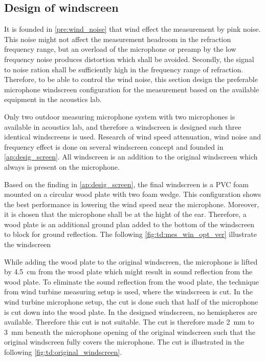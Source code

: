 \subsection{Design of windscreen}\label{ds:wind_scr}
It is founded in \autoref{pre:wind_noise} that wind effect the measurement by pink noise. This noise might not affect the measurement headroom in the refraction frequency range, but an overload of the microphone or preamp by the low frequency noise produces distortion which shall be avoided. Secondly, the signal to noise ration shall be sufficiently high in the frequency range of refraction. Therefore, to be able to control the wind noise, this section design the preferable microphone windscreen configuration for the measurement based on the available equipment in the acoustics lab. 

Only two outdoor measuring microphone system with two microphones is available in acoustics lab, and therefore a windscreen is designed such three identical windscreens is used. Research of wind speed attenuation, wind noise and frequency effect is done on several windscreen concept and founded in \autoref{ap:desig_screen}. All windscreen is an addition to the original windscreen which always is present on the microphone. 

Based on the finding in \autoref{ap:desig_screen}, the final windscreen is a PVC foam mounted on a circular wood plate with two foam wedge. This configuration shows the best performance in lowering the wind speed near the microphone. Moreover, it is chosen that the microphone shall be at the hight of the ear. Therefore, a wood plate is an additional ground plan added to the bottom of the windscreen to block for ground reflection. The following \autoref{fig:td:mes_win_opt_ver} illustrate the windscreen


While adding the wood plate to the original windscreen, the microphone is lifted by \SI{4.5}{\centi\meter} from the wood plate which might result in sound reflection from the wood plate. To eliminate the sound reflection from the wood plate, the technique from wind turbine measuring setup is used, where the windscreen is cut. In the wind turbine microphone setup, the cut is done such that half of the microphone is cut down into the wood plate. In the designed windscreen, no hemispheres are available. Therefore this cut is not suitable. The cut is therefore made \SI{2}{\milli\meter} to \SI{3}{\milli\meter} beneath the microphone opening of the original windscreen such that the original windscreen fully covers the microphone. The cut is illustrated in the following \autoref{fig:td:original_windscreen}. 

